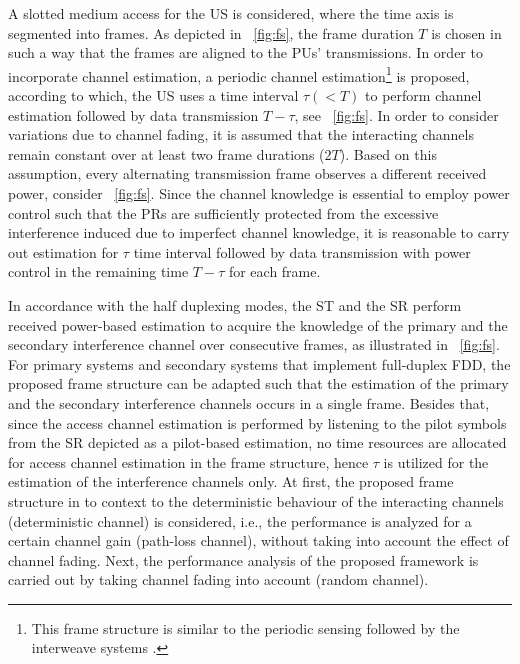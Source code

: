 A slotted medium access for the US is considered, where the time axis is segmented into frames. As depicted in \figurename~\ref{fig:fs}, the frame duration $T$ is chosen in such a way that the frames are aligned to the PUs' transmissions. In order to incorporate channel estimation, a periodic channel estimation\footnote{This frame structure is similar to the periodic sensing followed by the interweave systems \cite{Liang08}.} is proposed, according to which, the US uses a time interval $\tau (< T)$ to perform channel estimation followed by data transmission $T- \tau$, see \figurename~\ref{fig:fs}. In order to consider variations due to channel fading, it is assumed that the interacting channels remain constant over at least two frame durations ($2T$). Based on this assumption, every alternating transmission frame observes a different received power, consider \figurename~\ref{fig:fs}. Since the channel knowledge is essential to employ power control such that the PRs are sufficiently protected from the excessive interference induced due to imperfect channel knowledge, it is reasonable to carry out estimation for $\tau$ time interval followed by data transmission with power control in the remaining time $T - \tau$ for each frame. %

In accordance with the half duplexing modes, the ST and the SR perform received power-based estimation to acquire the knowledge of the primary and the secondary interference channel over consecutive frames, as illustrated in \figurename~\ref{fig:fs}. For primary systems and secondary systems that implement full-duplex FDD, the proposed frame structure can be adapted such that the estimation of the primary and the secondary interference channels occurs in a single frame. Besides that, since the access channel estimation is performed by listening to the pilot symbols from the SR depicted as a pilot-based estimation, no time resources are allocated for access channel estimation in the frame structure, hence $\tau$ is utilized for the estimation of the interference channels only. 
At first, the proposed frame structure in to context to the deterministic behaviour of the interacting channels (deterministic channel) is considered, i.e., the performance is analyzed for a certain channel gain (path-loss channel), without taking into account the effect of channel fading. Next, the performance analysis of the proposed framework is carried out by taking channel fading into account (random channel). %



